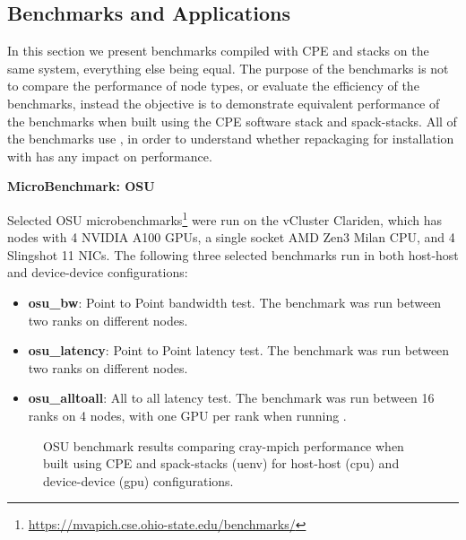 \subsection{Benchmarks and Applications}

In this section we present benchmarks compiled with CPE and \spack stacks on the same system, everything else being equal.
The purpose of the benchmarks is not to compare the performance of node types, or evaluate the efficiency of the benchmarks, instead the objective is to demonstrate equivalent performance of the benchmarks when built using the CPE software stack and spack-stacks.
All of the benchmarks use \craympich, in order to understand whether repackaging \craympich for installation with \spack has any impact on performance.

\noindent\textbf{MicroBenchmark: OSU}

Selected OSU microbenchmarks\footnote{\url{https://mvapich.cse.ohio-state.edu/benchmarks/}} were run on the vCluster Clariden, which has nodes with 4 NVIDIA  A100 GPUs, a single socket AMD Zen3 Milan CPU, and 4 Slingshot 11 NICs.
The following three selected benchmarks run in both host-host and device-device configurations:
\begin{itemize}
    \item \textbf{osu\_bw}: Point to Point bandwidth test. The benchmark was run between two ranks on different nodes.
    \item \textbf{osu\_latency}: Point to Point latency test. The benchmark was run between two ranks on different nodes.
    \item \textbf{osu\_alltoall}: All to all latency test. The benchmark was run between 16 ranks on 4 nodes, with one GPU per rank when running .
\end{itemize}

\begin{figure*}[htp!]
    \begin{center}
        
        \hfill
        
        \newline
        
        \hfill
        
        \newline
        
        \hfill
        
    \end{center}
    \caption{OSU benchmark results comparing cray-mpich performance when built using CPE and spack-stacks (uenv) for host-host (cpu) and device-device (gpu) configurations.}
    \label{fig:osu}
\end{figure*}

